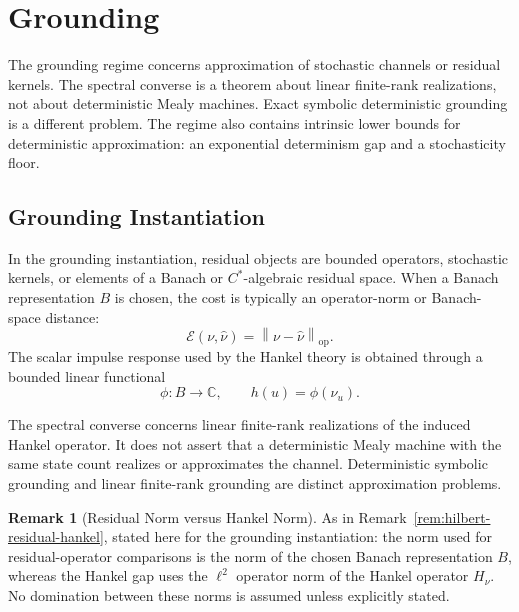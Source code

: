 \documentclass[12pt]{article}
\theoremstyle{definition}
\newtheorem{remark}[theorem]{Remark}
\newcommand{\norm}[1]{\left\lVert#1\right\rVert}
\begin{document}
\section{Grounding}
\label{sec:grounding}

The grounding regime concerns approximation of stochastic channels or residual
kernels.  The spectral converse is a theorem about linear finite-rank
realizations, not about deterministic Mealy machines.  Exact symbolic
deterministic grounding is a different problem.  The regime also contains
intrinsic lower bounds for deterministic approximation: an exponential
determinism gap and a stochasticity floor.

\subsection{Grounding Instantiation}
\label{subsec:grounding-instantiation}

In the grounding instantiation, residual objects are bounded operators,
stochastic kernels, or elements of a Banach or $C^*$-algebraic residual space.
When a Banach representation $B$ is chosen, the cost is typically an
operator-norm or Banach-space distance:
\[
\mathcal E(\nu,\widehat\nu)
=
\norm{\nu-\widehat\nu}_{\mathrm{op}}.
\]
The scalar impulse response used by the Hankel theory is obtained through a
bounded linear functional
\[
\phi:B\to\mathbb C,
\qquad
h(u)=\phi(\nu_u).
\]

The spectral converse concerns linear finite-rank realizations of the induced
Hankel operator.  It does not assert that a deterministic Mealy machine with
the same state count realizes or approximates the channel.  Deterministic
symbolic grounding and linear finite-rank grounding are distinct approximation
problems.

\begin{remark}[Residual Norm versus Hankel Norm]
\label{rem:grounding-residual-hankel}
As in Remark~\ref{rem:hilbert-residual-hankel}, stated here for the grounding
instantiation: the norm used for residual-operator comparisons is the norm of
the chosen Banach representation $B$, whereas the Hankel gap uses the $\ell^2$
operator norm of the Hankel operator $H_\nu$.  No domination between these
norms is assumed unless explicitly stated.
\end{remark}
\end{document}
